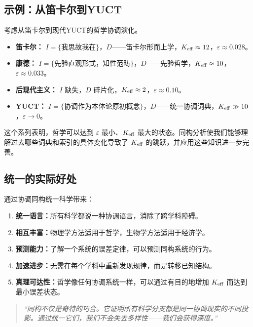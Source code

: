 \documentclass[11pt,a4paper]{article}
\newcommand{\eps}{\varepsilon}
\begin{document}
	\subsection{示例：从笛卡尔到YUCT}
	
	考虑从笛卡尔到现代YUCT的哲学协调演化。
	
	\begin{itemize}
		\item \textbf{笛卡尔：} \(I = \{\textit{我思故我在}\}\)，\(D\)——笛卡尔形而上学，\(\Keff \approx 12\)，\(\eps \approx 0.028\)。
		\item \textbf{康德：} \(I = \{\text{先验直观形式，知性范畴}\}\)，\(D\)——先验哲学，\(\Keff \approx 10\)，\(\eps \approx 0.033\)。
		\item \textbf{后现代主义：} \(I\) 缺失，\(D\) 碎片化，\(\Keff \approx 2\)，\(\eps \approx 0.10\)。
		\item \textbf{YUCT：} \(I = \{\text{协调作为本体论原初概念}\}\)，\(D\)——统一协调词典，\(\Keff \gg 10\)，\(\eps \to 0\)。
	\end{itemize}
	
	这个系列表明，哲学可以达到 \(\eps\) 最小、\(\Keff\) 最大的状态。同构分析使我们能够理解过去哪些词典和索引的具体变化导致了 \(\Keff\) 的跳跃，并应用这些知识进一步完善。
	
	\subsection{统一的实际好处}
	
	通过协调同构统一科学带来：
	
	\begin{enumerate}
		\item \textbf{统一语言：}所有科学都说一种协调语言，消除了跨学科障碍。
		\item \textbf{相互丰富：}物理学方法适用于哲学，生物学方法适用于经济学。
		\item \textbf{预测能力：}了解一个系统的误差定律，可以预测同构系统的行为。
		\item \textbf{加速进步：}无需在每个学科中重新发现规律，而是转移已知结构。
		\item \textbf{真理可达性：}哲学像任何协调系统一样，可以通过有目的地增加 \(\Keff\) 而达到最小误差状态。
	\end{enumerate}
	
	\begin{quote}
		\itshape
		“同构不仅是奇特的巧合。它证明所有科学分支都是同一协调现实的不同投影。通过统一它们，我们不会失去多样性——我们会获得深度。”
	\end{quote}
	
\end{document}
